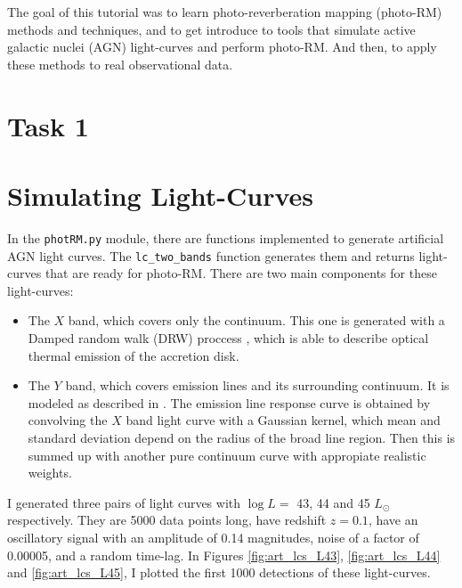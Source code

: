\documentclass[letterpaper, oneside]{article}
\begin{document}
	
\templatePagecfg

The goal of this tutorial was to learn photo-reverberation mapping (photo-RM) methods and techniques, and to get introduce to tools that simulate active galactic nuclei (AGN) light-curves and perform photo-RM. And then, to apply these methods to real observational data.


\section*{Task 1}

\section{Simulating Light-Curves}

In the \texttt{photRM.py} module, there are functions implemented to generate artificial AGN light curves. The \texttt{lc\_two\_bands} function generates them and returns light-curves that are ready for photo-RM. There are two main components for these light-curves:
\begin{itemize}
	\item The $X$ band, which covers only the continuum. This one is generated with a Damped random walk (DRW) proccess \cite{Kovacevic_2021, Kelly_2009}, which is able to describe optical thermal emission of the accretion disk.
	
	\item The $Y$ band, which covers emission lines and its surrounding continuum. It is modeled as described in \cite{Jankov_2022, Chelouche_Daniel_2012}. The emission line response curve is obtained by convolving the $X$ band light curve with a Gaussian kernel, which mean and standard deviation depend on the radius of the broad line region. Then this is summed up with another pure continuum curve with appropiate realistic weights.
\end{itemize}

I generated three pairs of light curves with $\log L = $ 43, 44 and 45 $L_{\odot}$ respectively. They are 5000 data points long, have redshift $z = 0.1$, have an oscillatory signal with an amplitude of 0.14 magnitudes, noise of a factor of 0.00005, and a random time-lag. In Figures \ref{fig:art_lcs_L43}, \ref{fig:art_lcs_L44} and \ref{fig:art_lcs_L45}, I plotted the first 1000 detections of these light-curves.
\end{document}
